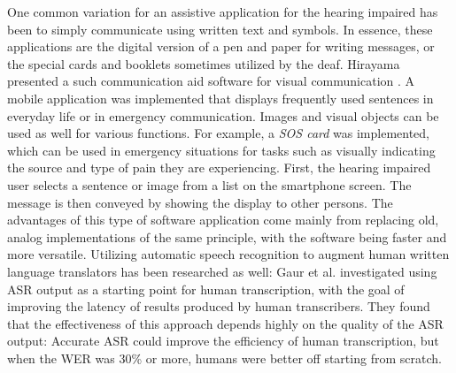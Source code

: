 \documentclass[english, 12pt, a4paper, pdftex, elec, utf8]{aaltothesis}
\begin{document}
One common variation for an assistive application for the hearing impaired has been to simply communicate using written text and symbols. In essence, these applications are the digital version of a pen and paper for writing messages, or the special cards and booklets sometimes utilized by the deaf. Hirayama presented a such communication aid software for visual communication \cite{hirayama2011communication}. A mobile application was implemented that displays frequently used sentences in everyday life or in emergency communication. Images and visual objects can be used as well for various functions. For example, a \textit{SOS card} was implemented, which can be used in emergency situations for tasks such as visually indicating the source and type of pain they are experiencing. First, the hearing impaired user selects a sentence or image from a list on the smartphone screen. The message is then conveyed by showing the display to other persons. The advantages of this type of software application come mainly from replacing old, analog implementations of the same principle, with the software being faster and more versatile. Utilizing automatic speech recognition to augment human written language translators has been researched as well: Gaur et al. \cite{gaur2016effects} investigated using ASR output as a starting point for human transcription, with the goal of improving the latency of results produced by human transcribers. They found that the effectiveness of this approach depends highly on the quality of the ASR output: Accurate ASR could improve the efficiency of human transcription, but when the WER was 30\% or more, humans were better off starting from scratch. \\\\
\end{document}
